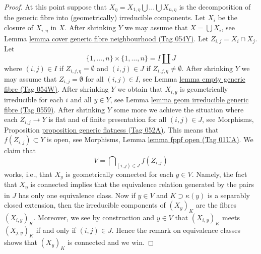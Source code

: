 \documentclass{amsart}
\theoremstyle{plain}
\theoremstyle{definition}
\theoremstyle{remark}
\numberwithin{equation}{subsection}
\begin{document}
\begin{proof}
\medskip\noindent
At this point suppose that
$X_\eta = X_{1, \eta} \bigcup \ldots \bigcup X_{n, \eta}$
is the decomposition of the generic fibre into
(geometrically) irreducible components.
Let $X_i$ be the closure of $X_{i, \eta}$ in $X$.
After shrinking $Y$ we may assume that
$X = \bigcup X_i$, see
Lemma \href{https://stacks.math.columbia.edu/tag/054Y}{lemma cover generic fibre neighbourhood (Tag 054Y)}.
Let $Z_{i, j} = X_i \cap X_j$.
Let
$$
\{1, \ldots, n\} \times \{1, \ldots, n\} = I \amalg J
$$
where $(i, j) \in I$ if $Z_{i, j, \eta} = \emptyset$ and
$(i, j) \in J$ if $Z_{i, j, \eta} \not = \emptyset$.
After shrinking $Y$ we may assume that $Z_{i, j} = \emptyset$
for all $(i, j) \in I$, see
Lemma \href{https://stacks.math.columbia.edu/tag/054W}{lemma empty generic fibre (Tag 054W)}.
After shrinking $Y$ we obtain that $X_{i, y}$
is geometrically irreducible for each $i$ and all $y \in Y$, see
Lemma \href{https://stacks.math.columbia.edu/tag/0559}{lemma geom irreducible generic fibre (Tag 0559)}.
After shrinking $Y$ some more we achieve the situation where
each $Z_{i, j} \to Y$ is flat and of finite presentation for
all $(i, j) \in J$, see
Morphisms, Proposition \href{https://stacks.math.columbia.edu/tag/052A}{proposition generic flatness (Tag 052A)}.
This means that $f(Z_{i, j}) \subset Y$ is open, see
Morphisms, Lemma \href{https://stacks.math.columbia.edu/tag/01UA}{lemma fppf open (Tag 01UA)}.
We claim that
$$
V  = \bigcap\nolimits_{(i, j) \in J} f(Z_{i, j})
$$
works, i.e., that $X_y$ is geometrically connected for each
$y \in V$. Namely, the fact that $X_\eta$ is connected implies that
the equivalence relation generated by the pairs in $J$ has only
one equivalence class. Now if $y \in V$ and $K \supset \kappa(y)$
is a separably closed extension, then the irreducible components
of $(X_y)_K$ are the fibres $(X_{i, y})_K$. Moreover, we see by
construction and $y \in V$ that $(X_{i, y})_K$ meets $(X_{j, y})_K$
if and only if $(i, j) \in J$. Hence the remark on equivalence classes
shows that $(X_y)_K$ is connected and we win.
\end{proof}
\end{document}
